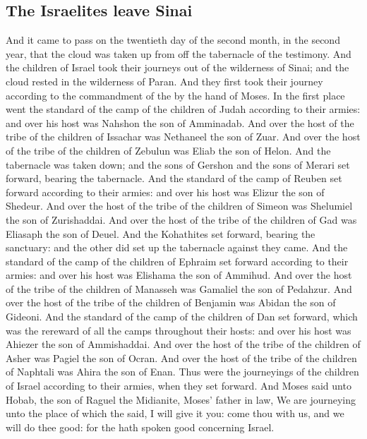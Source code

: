 \begin{biblechapter}
\section*{The Israelites leave Sinai}
\verse And it came to pass on the twentieth day of the second month, in the second year, that the cloud was taken up from off the tabernacle of the testimony.
\verse And the children of Israel took their journeys out of the wilderness of Sinai; and the cloud rested in the wilderness of Paran.
\verse And they first took their journey according to the commandment of the \LORD by the hand of Moses.
\verse In the first place went the standard of the camp of the children of Judah according to their armies: and over his host was Nahshon the son of Amminadab.
\verse And over the host of the tribe of the children of Issachar was Nethaneel the son of Zuar.
\verse And over the host of the tribe of the children of Zebulun was Eliab the son of Helon.
\verse And the tabernacle was taken down; and the sons of Gershon and the sons of Merari set forward, bearing the tabernacle.
\verse And the standard of the camp of Reuben set forward according to their armies: and over his host was Elizur the son of Shedeur.
\verse And over the host of the tribe of the children of Simeon was Shelumiel the son of Zurishaddai.
\verse And over the host of the tribe of the children of Gad was Eliasaph the son of Deuel.
\verse And the Kohathites set forward, bearing the sanctuary: and the other did set up the tabernacle against they came.
\verse And the standard of the camp of the children of Ephraim set forward according to their armies: and over his host was Elishama the son of Ammihud.
\verse And over the host of the tribe of the children of Manasseh was Gamaliel the son of Pedahzur.
\verse And over the host of the tribe of the children of Benjamin was Abidan the son of Gideoni.
\verse And the standard of the camp of the children of Dan set forward, which was the rereward of all the camps throughout their hosts: and over his host was Ahiezer the son of Ammishaddai.
\verse And over the host of the tribe of the children of Asher was Pagiel the son of Ocran.
\verse And over the host of the tribe of the children of Naphtali was Ahira the son of Enan.
\verse Thus were the journeyings of the children of Israel according to their armies, when they set forward.
\verse And Moses said unto Hobab, the son of Raguel the Midianite, Moses' father in law, We are journeying unto the place of which the \LORD said, I will give it you: come thou with us, and we will do thee good: for the \LORD hath spoken good concerning Israel.

\end{biblechapter}
